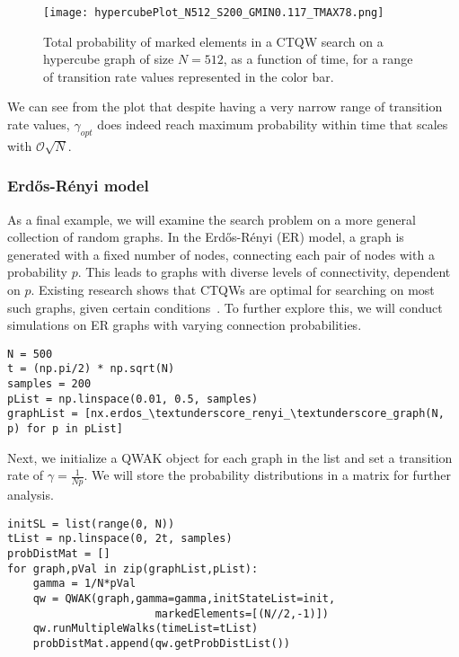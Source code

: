 \documentclass[main.tex]{subfiles}
\begin{document}
\begin{figure}[!h]
    \centering
    \texttt{[image: hypercubePlot\_N512\_S200\_GMIN0.117\_TMAX78.png]}
    \caption{Total probability of marked elements in a CTQW search on a hypercube
    graph of size $N=512$, as a function of time, for a range of transition
    rate values represented in the color bar.} 
    \label{fig:hypercubeSearch}
\end{figure}

We can see from the plot that despite having a very narrow range of transition
rate values, $\gamma_{opt}$ does indeed reach maximum probability within time
that scales with $\mathcal{O}\sqrt{N}$.

\subsubsection{Erdős-Rényi model}

As a final example, we will examine the search problem on a more general
collection of random graphs. In the Erdős-Rényi (ER) model, a graph is
generated with a fixed number of nodes, connecting each pair of nodes with a
probability $p$. This leads to graphs with diverse levels of connectivity,
dependent on $p$. Existing research shows that CTQWs are optimal for
searching on most such graphs, given certain conditions~\cite{chakraborty2016}.
To further explore this, we will conduct simulations on ER graphs with varying
connection probabilities.

\begin{lstlisting}[style=code,escapeinside={__}]
N = 500
t = (np.pi/2) * np.sqrt(N)
samples = 200
pList = np.linspace(0.01, 0.5, samples)
graphList = [nx.erdos_\textunderscore_renyi_\textunderscore_graph(N, p) for p in pList]
\end{lstlisting}


Next, we initialize a QWAK object for each graph in the list and set a
transition rate of $\gamma = \frac{1}{N p}$. We will store the probability
distributions in a matrix for further analysis.

\begin{lstlisting}[style=code,escapeinside={__}]
initSL = list(range(0, N))
tList = np.linspace(0, 2t, samples)
probDistMat = []
for graph,pVal in zip(graphList,pList):
    gamma = 1/N*pVal
    qw = QWAK(graph,gamma=gamma,initStateList=init,
                       markedElements=[(N//2,-1)])
    qw.runMultipleWalks(timeList=tList)
    probDistMat.append(qw.getProbDistList())
\end{lstlisting}
\end{document}
